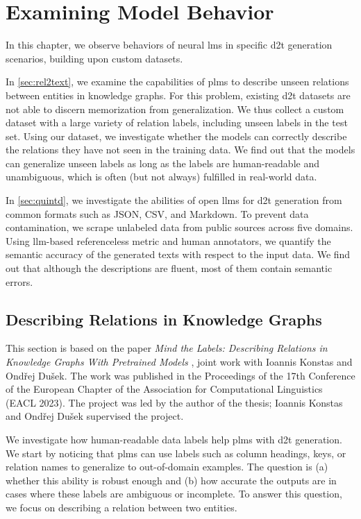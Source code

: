 
\chapter{Examining Model Behavior}
\label{chap:investigating}

In this chapter, we observe behaviors of neural \acp{lm} in specific \ac{d2t} generation scenarios, building upon custom datasets.

In \autoref{sec:rel2text}, we examine the capabilities of \acp{plm} to describe unseen relations between entities in knowledge graphs. For this problem, existing \ac{d2t} datasets are not able to discern memorization from generalization. We thus collect a custom dataset with a large variety of relation labels, including unseen labels in the test set. Using our dataset, we investigate whether the models can correctly describe the relations they have not seen in the training data. We find out that the models can generalize unseen labels as long as the labels are human-readable and unambiguous, which is often (but not always) fulfilled in real-world data.

In \autoref{sec:quintd}, we investigate the abilities of open \acp{llm} for \ac{d2t} generation from common formats such as JSON, CSV, and Markdown. To prevent data contamination, we scrape unlabeled data from public sources across five domains. Using \ac{llm}-based referenceless metric and human annotators, we quantify the semantic accuracy of the generated texts with respect to the input data. We find out that although the descriptions are fluent, most of them contain semantic errors.

\section{Describing Relations in Knowledge Graphs}
\label{sec:rel2text}
\begin{refbox}
    This section is based on the paper \emph{Mind the Labels: Describing Relations in Knowledge Graphs With Pretrained Models} \cite{kasnerMindLabelsDescribing2022}, joint work with Ioannis Konstas and Ondřej Dušek. The work was published in the Proceedings of the 17th Conference of the European Chapter of the Association for Computational Linguistics (EACL 2023). The project was led by the author of the thesis; Ioannis Konstas and Ondřej Dušek supervised the project.
\end{refbox}
We investigate how human-readable data labels help \acp{plm} with \ac{d2t} generation. We start by noticing that \acp{plm} can use labels such as column headings, keys, or relation names to generalize to out-of-domain examples. The question is (a) whether this ability is robust enough and (b) how accurate the outputs are in cases where these labels are ambiguous or incomplete. To answer this question, we focus on describing a relation between two entities.

